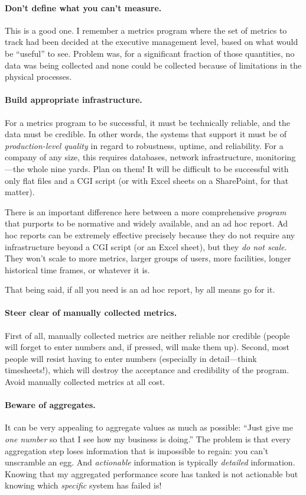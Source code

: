 \paragraph{Don't define what you can't measure.}
This is a good one.  I remember a metrics program where the set of
metrics to track had been decided at the executive management level,
based on what would be ``useful'' to see. Problem was, for a
significant fraction of those quantities, no data was being collected
and none could be collected because of limitations in the physical
processes.

\paragraph{Build appropriate infrastructure.}
For a metrics program to be successful, it must be technically
reliable, and the data must be credible. In other words, the systems
that support it must be of \emph{production-level quality} in regard
to robustness, uptime, and reliability. For a company of any size,
this requires databases, network infrastructure, monitoring---the
whole nine yards.  Plan on them! It will be difficult to be successful
with only flat files and a CGI script (or with Excel sheets on a
SharePoint, for that matter).

There is an important difference here between a more comprehensive
\emph{program} that purports to be normative and widely available, and
an ad hoc report.  Ad hoc reports can be extremely effective precisely
because they do not require any infrastructure beyond a CGI script (or
an Excel sheet), but they \emph{do not scale}. They won't scale to
more metrics, larger groups of users, more facilities, longer
historical time frames, or whatever it is.

That being said, if all you need is an ad hoc report, by all means go
for it.

\paragraph{Steer clear of manually collected metrics.}
First of all, manually collected metrics are neither reliable nor
credible (people will forget to enter numbers and, if pressed, will
make them up). Second, most people will resist having to enter numbers
(especially in detail---think timesheets!), which will destroy the
acceptance and credibility of the program.  Avoid manually collected
metrics at all cost.

\paragraph{Beware of aggregates.}
It can be very appealing to aggregate values as much as possible:
``Just give me \emph{one number} so that I see how my business is
doing.'' The problem is that every aggregation step loses information
that is impossible to regain: you can't unscramble an egg. And
\emph{actionable} information is typically \emph{detailed}
information. Knowing that my aggregated performance score has tanked
is not actionable but knowing which \emph{specific} system has failed
is!

